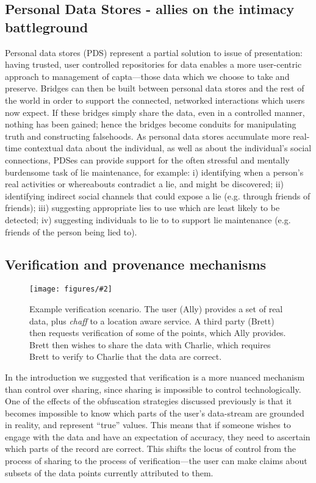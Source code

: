 \documentclass{IOS-Book-Article}     %
\newcommand{\fig}[3][0.9]{
\begin{figure}[tp]
\begin{center}
\texttt{[image: figures/\#2]}
\caption{#3}
\label{fig:#2}
\end{center}
\end{figure}
}
\newcommand{\tbox}[3][red]{{
\color{#1}\noindent{
   \fbox{\scriptsize{ {\bf #2} \textsl{#3}}}
   \vspace{2pt}
}
}}
\newcommand{\todo}[1]{\tbox{TODO:}{#1}}
\begin{document}


\subsection{Personal Data Stores - allies on the intimacy battleground}

Personal data stores (PDS) represent a partial solution to issue of
presentation: having trusted, user controlled repositories for data enables a
more user-centric approach to management of capta---those data which we choose
to take and preserve. Bridges can then be built between personal data stores and
the rest of the world in order to support the connected, networked interactions
which users now expect. If these bridges simply share the data, even in a
controlled manner, nothing has been gained; hence the bridges become conduits
for manipulating truth and constructing falsehoods. As personal data stores
accumulate more real-time contextual data about the individual, as well as about
the individual's social connections, PDSes can provide support for the often
stressful and mentally burdensome task of lie maintenance, for example: i)
identifying when a person's real activities or whereabouts contradict a lie, and
might be discovered; ii) identifying indirect social channels that could expose
a lie (e.g. through friends of friends); iii) suggesting appropriate lies to use
which are least likely to be detected; iv) suggesting individuals to lie to to
support lie maintenance (e.g. friends of the person being lied to).


\subsection{Verification and provenance mechanisms}

\fig{Verification}{Example verification scenario. The user (Ally) provides a set
of real data, plus \emph{chaff} to a location aware service. A third party
(Brett) then requests verification of some of the points, which Ally
provides. Brett then wishes to share the data with Charlie, which requires Brett
to verify to Charlie that the data are correct.}

In the introduction we suggested that verification is a more nuanced mechanism
than control over sharing, since sharing is impossible to control
technologically. One of the effects of the obfuscation strategies discussed
previously is that it becomes impossible to know which parts of the user's
data-stream are grounded in reality, and represent ``true'' values. This means
that if someone wishes to engage with the data and have an expectation of
accuracy, they need to ascertain which parts of the record are correct. This
shifts the locus of control from the process of sharing to the process of
verification---the user can make claims about subsets of the data points
currently attributed to them.
\end{document}
